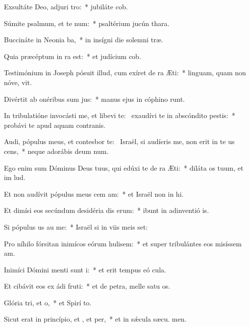 \item Exsultáte Deo, adjuri tro:~* jubiláte  cob.
\item Súmite psalmum, et te num:~* psaltérium jucún  thara.
\item Buccináte in Neonia ba,~* in insígni die solemni træ.
\item Quia præcéptum in ra est:~* et judícium  cob.
\item Testimónium in Joseph pósuit illud, cum exíret de ra Æti:~* linguam, quam non nóve, vit.
\item Divértit ab onéribus sum jus:~* manus ejus in cóphino runt.
\item In tribulatióne invocásti me, et libevi te:~\pscross{} exaudívi te in abscóndito pestis:~* probávi te apud aquam contranis.
\item Audi, pópulus meus, et contesbor te:~\pscross{} Israël, si audíeris me, non erit in te us cens,~* neque adorábis deum num.
\item Ego enim sum Dóminus Deus tuus, qui edúxi te de ra Æti:~* diláta os tuum, et im lud.
\item Et non audívit pópulus meus cem am:~* et Israël non in hi.
\item Et dimísi eos secúndum desidéria dis erum:~* ibunt in adinventió is.
\item Si pópulus us au me:~* Israël si in viis meis set:
\item Pro níhilo fórsitan inimícos eórum hulisem:~* et super tribulántes eos misíssem  am.
\item Inimíci Dómini menti sunt i:~* et erit tempus eó  cula.
\item Et cibávit eos ex ádi fruti:~* et de petra, melle satu os.
\item Glória tri, et o,~* et Spirí to.
\item Sicut erat in princípio, et , et per,~* et in sǽcula sæcu. men.
